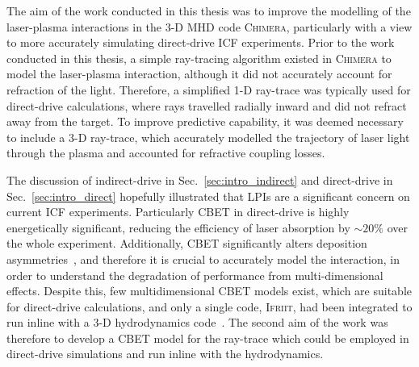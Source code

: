The aim of the work conducted in this thesis was to improve the modelling of the laser-plasma interactions in the 3-D \ac{MHD} code \textsc{Chimera}, particularly with a view to more accurately simulating direct-drive \ac{ICF} experiments.
Prior to the work conducted in this thesis, a simple ray-tracing algorithm existed in \textsc{Chimera} to model the laser-plasma interaction, although it did not accurately account for refraction of the light.
Therefore, a simplified 1-D ray-trace was typically used for direct-drive calculations, where rays travelled radially inward and did not refract away from the target.
To improve predictive capability, it was deemed necessary to include a 3-D ray-trace, which accurately modelled the trajectory of laser light through the plasma and accounted for refractive coupling losses.

The discussion of indirect-drive in Sec.~\ref{sec:intro_indirect} and direct-drive in Sec.~\ref{sec:intro_direct} hopefully illustrated that \ac{LPIs} are a significant concern on current \ac{ICF} experiments.
Particularly \ac{CBET} in direct-drive is highly energetically significant, reducing the efficiency of laser absorption by $\sim20\%$ over the whole experiment.
Additionally, \ac{CBET} significantly alters deposition asymmetries~\cite{colaitis_inverse_2021}, and therefore it is crucial to accurately model the interaction, in order to understand the degradation of performance from multi-dimensional effects.
Despite this, few multidimensional \ac{CBET} models exist, which are suitable for direct-drive calculations, and only a single code, \textsc{Ifriit}, had been integrated to run inline with a 3-D hydrodynamics code~\cite{colaitis_inverse_2021}.
The second aim of the work was therefore to develop a \ac{CBET} model for the ray-trace which could be employed in direct-drive simulations and run inline with the hydrodynamics.

